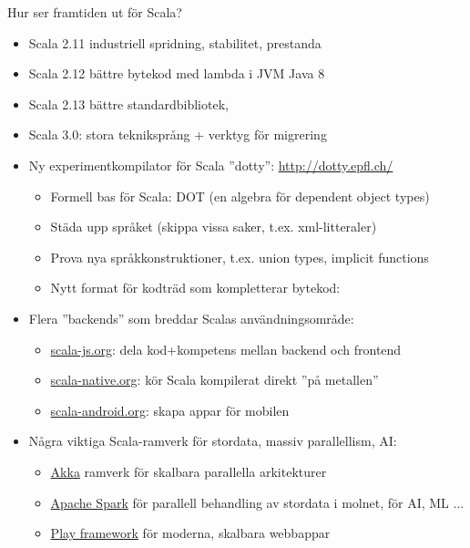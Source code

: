 \begin{Slide}{Hur ser framtiden ut för Scala?}\SlideFontSmall

\begin{itemize}
\item Scala 2.11 industriell spridning, stabilitet, prestanda
\item Scala 2.12 bättre bytekod med lambda i JVM Java 8
\item Scala 2.13 bättre standardbibliotek, 
\item Scala 3.0: stora tekniksprång + verktyg för migrering
\item Ny experimentkompilator för Scala ''dotty'': \url{http://dotty.epfl.ch/}
\begin{itemize}\SlideFontTiny
  \item Formell bas för Scala: DOT (en algebra för dependent object types)
  \item Städa upp språket (skippa vissa saker, t.ex. xml-litteraler)
  \item Prova nya språkkonstruktioner, t.ex. union types, implicit functions
  \item Nytt format för kodträd som kompletterar bytekod: \\
\end{itemize}
\item Flera ''backends'' som breddar Scalas användningsområde:
\begin{itemize}\SlideFontTiny
  \item \href{http://www.scala-js.org/}{scala-js.org}: dela kod+kompetens mellan backend och frontend
  \item \href{http://scala-native.org}{scala-native.org}: kör Scala kompilerat direkt ''på metallen''
  \item \href{http://scala-android.org}{scala-android.org}: skapa appar för mobilen
\end{itemize}
\item Några viktiga Scala-ramverk för stordata, massiv parallellism, AI:
\begin{itemize}\SlideFontTiny
  \item \href{https://akka.io/}{Akka} ramverk för skalbara parallella arkitekturer
  \item \href{https://spark.apache.org/}{Apache Spark} för parallell behandling av stordata i molnet, för AI, ML ...
  \item \href{https://www.playframework.com/}{Play framework} för moderna, skalbara webbappar
\end{itemize}
\end{itemize}
\end{Slide}


